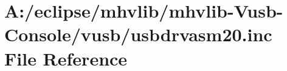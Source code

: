 \hypertarget{mhvlib-_vusb-_console_2vusb_2usbdrvasm20_8inc}{\section{A\-:/eclipse/mhvlib/mhvlib-\/\-Vusb-\/\-Console/vusb/usbdrvasm20.inc File Reference}
\label{mhvlib-_vusb-_console_2vusb_2usbdrvasm20_8inc}
}
